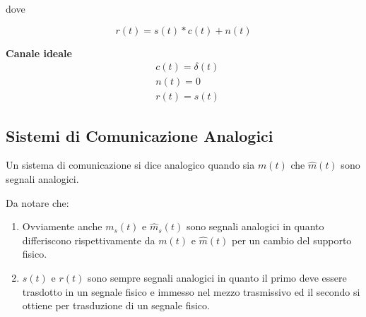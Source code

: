 dove

\[
    r(t) = s(t) \ast c(t) + n(t)
\]

\textbf{Canale ideale}
\begin{align*}
                     & c(t) = \delta(t) \\
                     & n(t) = 0         \\
                    & r(t) = s(t)
\end{align*}


\subsection*{Sistemi di Comunicazione Analogici}
Un sistema di comunicazione si dice analogico quando sia \( m(t) \) che \( \hat{m}(t) \) sono segnali analogici.

Da notare che:
\begin{enumerate}
    \item Ovviamente anche \( m_s(t) \) e \( \hat{m}_s(t) \) sono segnali analogici in quanto differiscono rispettivamente da \( m(t) \) e \( \hat{m}(t) \) per un cambio del supporto fisico.
    \item \( s(t) \) e \( r(t) \) sono sempre segnali analogici in quanto il primo deve essere trasdotto in un segnale fisico e immesso nel mezzo trasmissivo ed il secondo si ottiene per trasduzione di un segnale fisico.
\end{enumerate}
